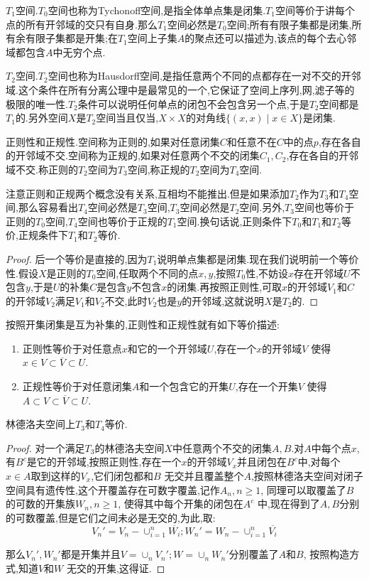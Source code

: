 $T_1$空间.$T_0$空间也称为Tychonoff空间,是指全体单点集是闭集.$T_1$空间等价于讲每个点的所有开邻域的交只有自身.那么$T_1$空间必然是$T_0$空间;所有有限子集都是闭集,所有余有限子集都是开集;在$T_1$空间上子集$A$的聚点还可以描述为,该点的每个去心邻域都包含$A$中无穷个点.

$T_2$空间.$T_2$空间也称为Hausdorff空间,是指任意两个不同的点都存在一对不交的开邻域.这个条件在所有分离公理中是最常见的一个,它保证了空间上序列,网,滤子等的极限的唯一性.$T_2$条件可以说明任何单点的闭包不会包含另一个点,于是$T_2$空间都是$T_1$的.另外空间$X$是$T_2$空间当且仅当,$X\times X$的对角线$\{(x,x)\mid x\in X\}$是闭集.

正则性和正规性.空间称为正则的,如果对任意闭集$C$和任意不在$C$中的点$p$,存在各自的开邻域不交.空间称为正规的,如果对任意两个不交的闭集$C_1,C_2$,存在各自的开邻域不交.称正则的$T_2$空间为$T_3$空间,称正规的$T_2$空间为$T_4$空间.

注意正则和正规两个概念没有关系,互相均不能推出.但是如果添加$T_2$作为$T_3$和$T_4$空间,那么容易看出$T_4$空间必然是$T_3$空间,$T_3$空间必然是$T_2$空间.另外,$T_3$空间也等价于正则的$T_0$空间,$T_4$空间也等价于正规的$T_1$空间.换句话说,正则条件下$T_0$和$T_1$和$T_2$等价,正规条件下$T_1$和$T_2$等价.
\begin{proof}
	
	后一个等价是直接的,因为$T_1$说明单点集都是闭集.现在我们说明前一个等价性.假设$X$是正则的$T_0$空间,任取两个不同的点$x,y$,按照$T_0$性,不妨设$x$存在开邻域$U$不包含$y$,于是$U$的补集$C$是包含$y$不包含$x$的闭集.再按照正则性,可取$x$的开邻域$V_1$和$C$的开邻域$V_2$满足$V_1$和$V_2$不交,此时$V_2$也是$y$的开邻域,这就说明$X$是$T_2$的.
\end{proof}

按照开集闭集是互为补集的,正则性和正规性就有如下等价描述:
\begin{enumerate}
	\item 正则性等价于对任意点$x$和它的一个开邻域$U$,存在一个$x$的开邻域$V$ 使得$x\in V\subset\overline{V}\subset U$.
	\item 正规性等价于对任意闭集$A$和一个包含它的开集$U$,存在一个开集$V$ 使得$A\subset V\subset\overline{V}\subset U$.
\end{enumerate}

林德洛夫空间上$T_3$和$T_4$等价.
\begin{proof}

对一个满足$T_3$的林德洛夫空间$X$中任意两个不交的闭集$A,B$.对$A$中每个点$x$,有$B^c$是它的开邻域,按照正则性,存在一个$x$的开邻域$V_x$并且闭包在$B^c$中,对每个$x\in A$取到这样的$V_x$,它们闭包都和$B$ 无交并且覆盖整个$A$,按照林德洛夫空间对闭子空间具有遗传性,这个开覆盖存在可数字覆盖,记作$A_n,n\ge1$, 同理可以取覆盖了$B$的可数的开集族$W_n,n\ge1$, 使得其中每个开集的闭包在$A^c$ 中,现在得到了$A,B$分别的可数覆盖,但是它们之间未必是无交的,为此,取:
$$V_n'=V_n-\cup_{i=1}^n\overline{W_i};W_n'=W_n-\cup_{i=1}^n\overline{V_i}$$

那么$V_n',W_n'$都是开集并且$V=\cup_{n}V_n';W=\cup_nW_n'$分别覆盖了$A$和$B$, 按照构造方式,知道$V$和$W$ 无交的开集,这得证.
\end{proof}

